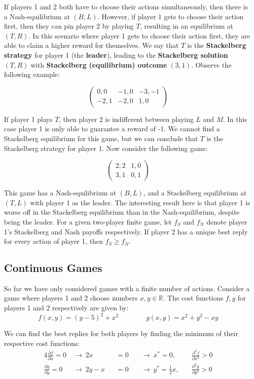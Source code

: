 \documentclass[12pt]{article}
\begin{document}
\noindent
If players 1 and 2 both have to choose their actions simultaneously, then there is a Nash-equilibrium at $(B, L)$.
However, if player 1 gets to choose their action first, then they can pin player 2 by playing $T$, resulting in an equilibrium at $(T, R)$.
In this scenario where player 1 gets to choose their action first, they are able to claim a higher reward for themselves.
We say that $T$ is the \textbf{Stackelberg strategy} for player 1 (the \textbf{leader}), leading to the \textbf{Stackelberg solution} $(T, R)$ with \textbf{Stackelberg (equilibrium) outcome} $(3, 1)$.
Observe the following example:

\[ \begin{pmatrix}
    0, 0 & -1, 0 & -3, -1 \\
    -2, 1 & -2, 0 & 1, 0
\end{pmatrix} \]

\newpage
\noindent
If player 1 plays $T$, then player 2 is indifferent between playing $L$ and $M$.
In this case player 1 is only able to guarantee a reward of -1. We cannot find a Stackelberg equilibrium for this game, but we can conclude that $T$ is the Stackelberg strategy for player 1.
Now consider the following game:

\[ \begin{pmatrix}
    2, 2 & 1, 0 \\
    3, 1 & 0, 1
\end{pmatrix} \]

\noindent
This game has a Nash-equilibrium at $(B, L)$, and a Stackelberg equilibrium at $(T, L)$ with player 1 as the leader.
The interesting result here is that player 1 is worse off in the Stackelberg equilibrium than in the Nash-equilibrium, despite being the leader.
For a given two-player finite game, let $f_S$ and $f_N$ denote player 1's Stackelberg and Nash payoffs respectively.
If player 2 has a unique best reply for every action of player 1, then $f_S \geq f_N$.

\subsection{Continuous Games}
So far we have only considered games with a finite number of actions.
Consider a game where players 1 and 2 choose numbers $x, y \in \mathbb{R}$.
The cost functions $f, g$ for players 1 and 2 respectively are given by:
\[ f(x, y) = (y-5)^2 + x^2 \qquad \qquad g(x, y) = x^2 + y^2 - xy \]

\noindent
We can find the best replies for both players by finding the minimum of their respective cost functions:
\begin{alignat*}{4}
    \frac{\partial f}{\partial x} = 0 &\ \rightarrow\ 2x &&= 0 &&\ \rightarrow\ x^* = 0, \quad &\frac{\partial^2 f}{\partial x^2} > 0 \\
    \frac{\partial g}{\partial y} = 0 &\ \rightarrow\ 2y - x &&= 0 &&\ \rightarrow\ y^* = \frac{1}{2}x, \quad &\frac{\partial^2 g}{\partial y^2} > 0
\end{alignat*}
\end{document}
